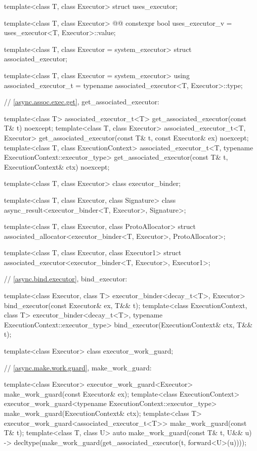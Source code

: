 \begin{codeblock}
{  template<class T, class Executor> struct uses_executor;

  template<class T, class Executor>
    @@ constexpr bool uses_executor_v = uses_executor<T, Executor>::value;

  template<class T, class Executor = system_executor>
    struct associated_executor;

  template<class T, class Executor = system_executor>
    using associated_executor_t = typename associated_executor<T, Executor>::type;

  // \ref{async.assoc.exec.get}, get_associated_executor:

  template<class T>
    associated_executor_t<T> get_associated_executor(const T& t) noexcept;
  template<class T, class Executor>
    associated_executor_t<T, Executor>
      get_associated_executor(const T& t, const Executor& ex) noexcept;
  template<class T, class ExecutionContext>
    associated_executor_t<T, typename ExecutionContext::executor_type>
      get_associated_executor(const T& t, ExecutionContext& ctx) noexcept;

  template<class T, class Executor>
    class executor_binder;

  template<class T, class Executor, class Signature>
    class async_result<executor_binder<T, Executor>, Signature>;

  template<class T, class Executor, class ProtoAllocator>
    struct associated_allocator<executor_binder<T, Executor>, ProtoAllocator>;

  template<class T, class Executor, class Executor1>
    struct associated_executor<executor_binder<T, Executor>, Executor1>;

  // \ref{async.bind.executor}, bind_executor:

  template<class Executor, class T>
    executor_binder<decay_t<T>, Executor>
      bind_executor(const Executor& ex, T&& t);
  template<class ExecutionContext, class T>
    executor_binder<decay_t<T>, typename ExecutionContext::executor_type>
      bind_executor(ExecutionContext& ctx, T&& t);

  template<class Executor>
    class executor_work_guard;

  // \ref{async.make.work.guard}, make_work_guard:

  template<class Executor>
    executor_work_guard<Executor>
      make_work_guard(const Executor& ex);
  template<class ExecutionContext>
    executor_work_guard<typename ExecutionContext::executor_type>
      make_work_guard(ExecutionContext& ctx);
  template<class T>
    executor_work_guard<associated_executor_t<T>>
      make_work_guard(const T& t);
  template<class T, class U>
    auto make_work_guard(const T& t, U&& u)
      -> decltype(make_work_guard(get_associated_executor(t, forward<U>(u))));

}
\end{codeblock}
